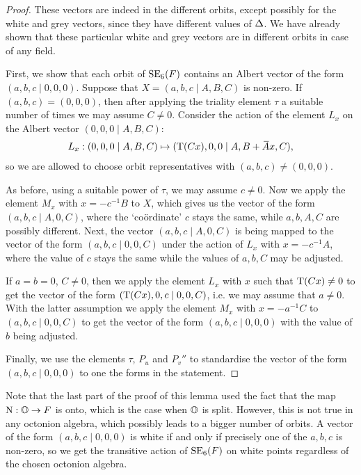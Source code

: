 \begin{proof}
	These vectors are indeed in the different orbits, except possibly for the white 
	and grey vectors, since they have different values of $\Delta$. We have already
	shown that these particular 
	white and grey vectors are in different orbits in case of any field. 
	
	First, we show that each orbit of $\mathrm{SE}_6(F)$ contains an Albert vector of the form
	$(a,b,c\mid 0,0,0)$. Suppose that $X = (a,b,c\mid A,B,C)$ is non-zero. If
	\mbox{$(a,b,c) = (0,0,0)$}, then after applying the triality element $\tau$ a suitable number
	of times we may assume $C \neq 0$. Consider the action of the element $L_x$ on
	the Albert vector $(0,0,0\mid A,B,C)$: 
	\begin{equation*}
		\begin{array}{r@{\;}c@{\;}l}
			L_x: (0,0,0\mid A,B,C) & \mapsto & (\Tr(Cx),0,0\mid A,B+\ovA x, C),
		\end{array}
	\end{equation*}
	so we are allowed to choose orbit representatives with $(a,b,c) \neq (0,0,0)$. 
	
	As before, using a suitable power of $\tau$, we may assume $c \neq 0$. Now we apply 
	the element $M_x$ with $x = -c^{-1}B$ to $X$, which gives us the vector of the form
	$(a,b,c\mid A,0,C)$, where the `co\"{o}rdinate' $c$ stays the same, while 
	$a,b,A,C$ are possibly different. Next, the vector $(a,b,c\mid A,0,C)$ is being mapped
	to the vector of the form $(a,b,c\mid 0,0,C)$ under the action of $L_x$ with
	$x = -c^{-1}A$, where the value of $c$ stays the same while the values of 
	$a,b,C$ may be adjusted. 
	
	If $a=b=0$, $C \neq 0$, then we apply the element $L_x$ with $x$ such that 
	\mbox{$\operatorname{T}(Cx)\neq 0$} to get the vector of the form $(\operatorname{T}(Cx),0,c\mid 0,0,C)$, i.e.
	we may assume that \mbox{$a \neq 0$}. With the latter assumption we apply the element
	$M_x$ with $x = -a^{-1} C$ to \mbox{$(a,b,c\mid 0,0,C)$} to get the vector of the form
	$(a,b,c\mid 0,0,0)$ with the value of $b$ being adjusted. 
	
	Finally, we use the elements $\tau$, $P_u$ and $P_v''$ to standardise the vector
	of the form $(a,b,c\mid 0,0,0)$ to one the forms in the statement. 
\end{proof}

Note that the last part of the proof of this lemma used the fact that the map
$\mathord{\mathrm{N}} : \mathbb{O} \rightarrow F$ is onto, which is the case when $\mathbb{O}$ is split. 
However, this is not true in any octonion algebra, which possibly leads 
to a bigger number of orbits. A vector of the form $(a,b,c\mid 0,0,0)$ is 
white if and only if precisely one of the $a,b,c$ is non-zero, so we get 
the transitive action of $\mathrm{SE}_6(F)$ on white points regardless of the 
chosen octonion algebra. 

